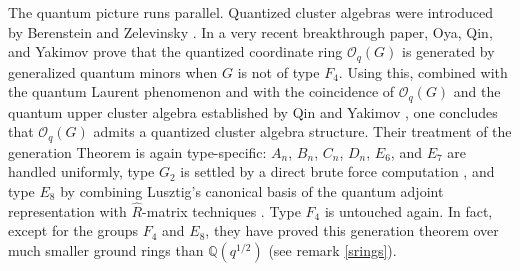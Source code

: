 \documentclass[12pt]{amsart}
\theoremstyle{plain}
\theoremstyle{remark}
\begin{document}
The quantum picture runs parallel. Quantized cluster algebras were introduced by
Berenstein and Zelevinsky \cite{BZ}. In a very recent breakthrough paper, Oya, Qin, and Yakimov \cite{OQY} prove that
the quantized coordinate ring $\mathcal{O}_q(G)$ is generated by generalized quantum
minors when $G$ is not of type $F_4$. Using this, combined with the quantum Laurent phenomenon \cite{BZ} and with the coincidence of
$\mathcal{O}_q(G)$ and the quantum upper cluster algebra established by Qin and
Yakimov \cite{QY}, one concludes that $\mathcal{O}_q(G)$ admits a quantized cluster algebra
structure. Their treatment of the generation Theorem is again type-specific: $A_n$, $B_n$, $C_n$,
$D_n$, $E_6$, and $E_7$ are handled uniformly, type $G_2$ is settled by a direct brute force
computation \cite[Theorem~5.7]{OQY}, and type $E_8$ by combining Lusztig's canonical
basis of the quantum adjoint representation \cite{Lusztig} with $\hat{R}$-matrix techniques  
\cite[Theorem~5.9]{OQY}. Type $F_4$ is untouched again. In fact, except for the groups $F_4$ and $E_8$, they have proved this generation theorem over much smaller ground rings than $\mathbb{Q}(q^{1/2})$ (see remark \ref{srings}). 
\end{document}
